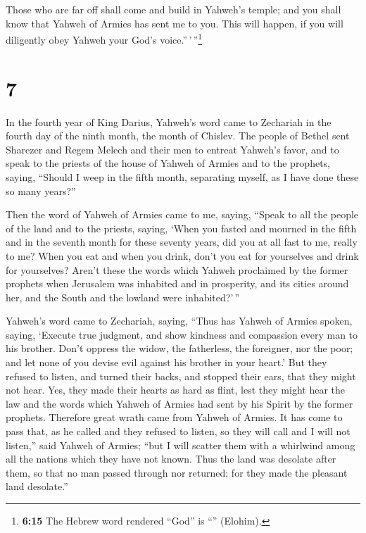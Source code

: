  Those who are far off shall come and build in Yahweh's
temple; and you shall know that Yahweh of Armies has sent me to you.
This will happen, if you will diligently obey Yahweh your God's
voice.''\,'\,''\footnote{\textbf{6:15} The Hebrew word rendered ``God''
  is ``'' (Elohim).}

\hypertarget{section-6}{%
\section{7}\label{section-6}}

 In the fourth year of King Darius, Yahweh's word came to
Zechariah in the fourth day of the ninth month, the month of Chislev.
 The people of Bethel sent Sharezer and Regem Melech and
their men to entreat Yahweh's favor,  and to speak to the
priests of the house of Yahweh of Armies and to the prophets, saying,
``Should I weep in the fifth month, separating myself, as I have done
these so many years?''

 Then the word of Yahweh of Armies came to me, saying,
 ``Speak to all the people of the land and to the priests,
saying, `When you fasted and mourned in the fifth and in the seventh
month for these seventy years, did you at all fast to me, really to me?
 When you eat and when you drink, don't you eat for
yourselves and drink for yourselves?  Aren't these the
words which Yahweh proclaimed by the former prophets when Jerusalem was
inhabited and in prosperity, and its cities around her, and the South
and the lowland were inhabited?'\,''

 Yahweh's word came to Zechariah, saying, 
``Thus has Yahweh of Armies spoken, saying, `Execute true judgment, and
show kindness and compassion every man to his brother. 
Don't oppress the widow, the fatherless, the foreigner, nor the poor;
and let none of you devise evil against his brother in your heart.'
 But they refused to listen, and turned their backs, and
stopped their ears, that they might not hear.  Yes, they
made their hearts as hard as flint, lest they might hear the law and the
words which Yahweh of Armies had sent by his Spirit by the former
prophets. Therefore great wrath came from Yahweh of Armies.
 It has come to pass that, as he called and they refused
to listen, so they will call and I will not listen,'' said Yahweh of
Armies;  ``but I will scatter them with a whirlwind among
all the nations which they have not known. Thus the land was desolate
after them, so that no man passed through nor returned; for they made
the pleasant land desolate.''

